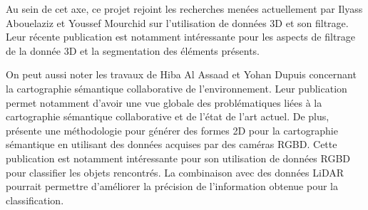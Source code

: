 \documentclass[a4paper, french, 10pt, onecolumn, notitlepage, roman]{article}
\begin{document}
Au sein de cet axe, ce projet rejoint les recherches menées actuellement par Ilyass Abouelaziz et Youssef Mourchid sur l'utilisation de données 3D et son filtrage.
Leur récente publication \cite{abouelaziz:arxiv:2024} est notamment intéressante pour les aspects de filtrage de la donnée 3D et la segmentation des éléments présents.

On peut aussi noter les travaux de Hiba Al Assaad et Yohan Dupuis concernant la cartographie sémantique collaborative de l'environnement.
Leur publication \cite{achour:as:2022} permet notamment d'avoir une vue globale des problématiques liées à la cartographie sémantique collaborative et de l'état de l'art actuel.
De plus, \cite{achour:gretsi:2023} présente une méthodologie pour générer des formes 2D pour la cartographie sémantique en utilisant des données acquises par des caméras RGBD.
Cette publication est notamment intéressante pour son utilisation de données RGBD pour classifier les objets rencontrés.
La combinaison avec des données LiDAR pourrait permettre d'améliorer la précision de l'information obtenue pour la classification.

\vspace{0.5cm}

\newpage
\printbibliography

\end{document}
